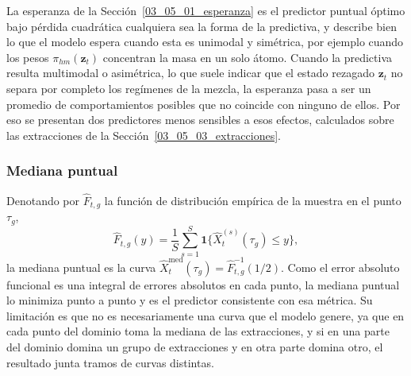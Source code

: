 La esperanza de la Sección~\ref{03_05_01_esperanza} es el predictor puntual óptimo bajo pérdida cuadrática cualquiera sea la forma de la predictiva, y describe bien lo que el modelo espera cuando esta es unimodal y simétrica, por ejemplo cuando los pesos $\pi_{hm}(\mathbf{z}_t)$ concentran la masa en un solo átomo. Cuando la predictiva resulta multimodal o asimétrica, lo que suele indicar que el estado rezagado $\mathbf{z}_t$ no separa por completo los regímenes de la mezcla, la esperanza pasa a ser un promedio de comportamientos posibles que no coincide con ninguno de ellos. Por eso se presentan dos predictores menos sensibles a esos efectos, calculados sobre las extracciones de la Sección~\ref{03_05_03_extracciones}.
 

\subsubsection{Mediana puntual}
\label{03_05_04_01_mediana_puntual}

Denotando por $\widehat{F}_{t,g}$ la función de distribución empírica de la muestra en el punto $\tau_g$,
\begin{equation}\label{eq:fdist_empirica}
    \widehat{F}_{t,g}(y) = \frac{1}{S}\sum_{s=1}^{S}
    \mathbf{1}\bigl\{\widehat{X}_{t}^{(s)}(\tau_g) \leq y\bigr\},
\end{equation}
la mediana puntual es la curva $\widehat{X}_t^{\mathrm{med}}(\tau_g) = \widehat{F}_{t,g}^{-1}(1/2)$. Como el error absoluto funcional es una integral de errores absolutos en cada punto, la mediana puntual lo minimiza punto a punto y es el predictor consistente con esa métrica. Su limitación es que no es necesariamente una curva que el modelo genere, ya que en cada punto del dominio toma la mediana de las extracciones, y si en una parte del dominio domina un grupo de extracciones y en otra parte domina otro, el resultado junta tramos de curvas distintas. 


